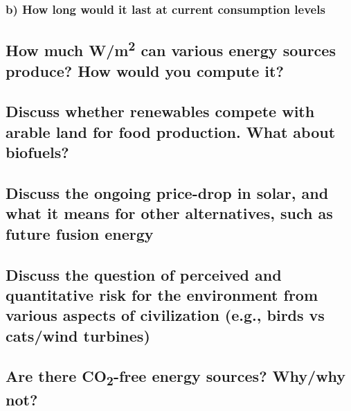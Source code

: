 \subsubsection{b) How long would it last at current consumption levels}
\solutionblock{}

\subsection{How much W/m\textsuperscript{2} can various energy sources produce? How would you compute it?}
\solutionblock{}

\subsection{Discuss whether renewables compete with arable land for food production. What about biofuels?}
\solutionblock{}

\subsection{Discuss the ongoing price-drop in solar, and what it means for other alternatives, such as future fusion energy}
\solutionblock{}

\subsection{Discuss the question of perceived and quantitative risk for the environment from various aspects of civilization (e.g., birds vs cats/wind turbines)}
\solutionblock{}

\subsection{Are there CO\textsubscript{2}-free energy sources? Why/why not?}
\solutionblock{}
